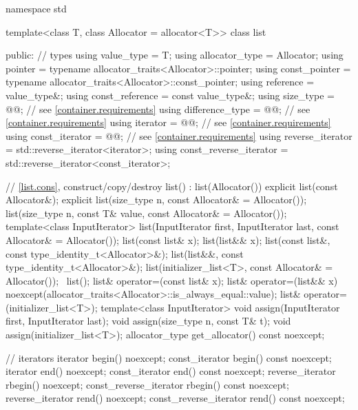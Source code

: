 \begin{codeblock}
namespace std {
  template<class T, class Allocator = allocator<T>>
  class list {
  public:
    // types
    using value_type             = T;
    using allocator_type         = Allocator;
    using pointer                = typename allocator_traits<Allocator>::pointer;
    using const_pointer          = typename allocator_traits<Allocator>::const_pointer;
    using reference              = value_type&;
    using const_reference        = const value_type&;
    using size_type              = @@; // see \ref{container.requirements}
    using difference_type        = @@; // see \ref{container.requirements}
    using iterator               = @@; // see \ref{container.requirements}
    using const_iterator         = @@; // see \ref{container.requirements}
    using reverse_iterator       = std::reverse_iterator<iterator>;
    using const_reverse_iterator = std::reverse_iterator<const_iterator>;

    // \ref{list.cons}, construct/copy/destroy
    list() : list(Allocator()) { }
    explicit list(const Allocator&);
    explicit list(size_type n, const Allocator& = Allocator());
    list(size_type n, const T& value, const Allocator& = Allocator());
    template<class InputIterator>
      list(InputIterator first, InputIterator last, const Allocator& = Allocator());
    list(const list& x);
    list(list&& x);
    list(const list&, const type_identity_t<Allocator>&);
    list(list&&, const type_identity_t<Allocator>&);
    list(initializer_list<T>, const Allocator& = Allocator());
    ~list();
    list& operator=(const list& x);
    list& operator=(list&& x)
      noexcept(allocator_traits<Allocator>::is_always_equal::value);
    list& operator=(initializer_list<T>);
    template<class InputIterator>
      void assign(InputIterator first, InputIterator last);
    void assign(size_type n, const T& t);
    void assign(initializer_list<T>);
    allocator_type get_allocator() const noexcept;

    // iterators
    iterator               begin() noexcept;
    const_iterator         begin() const noexcept;
    iterator               end() noexcept;
    const_iterator         end() const noexcept;
    reverse_iterator       rbegin() noexcept;
    const_reverse_iterator rbegin() const noexcept;
    reverse_iterator       rend() noexcept;
    const_reverse_iterator rend() const noexcept;

}}
\end{codeblock}
